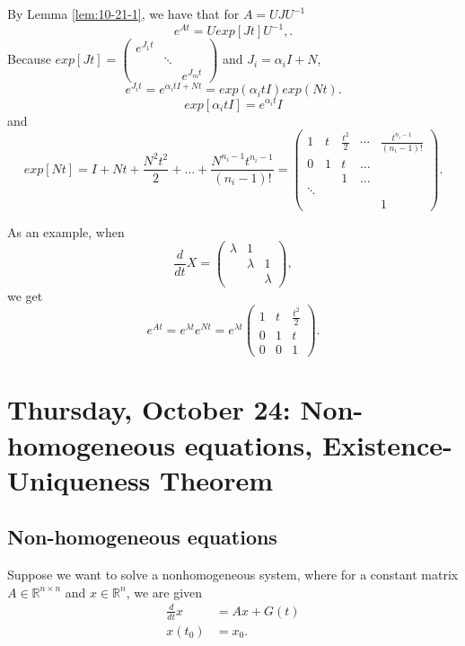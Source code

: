 \documentclass{tufte-handout}
\newcommand*\R{\mathbb{R}}
\theoremstyle{definition}
\begin{document}
By Lemma \ref{lem:10-21-1}, we have that for $A = U J U^{-1}$ \[
	e^{At} = U exp[Jt]U^{-1}
,.\] Because $exp[Jt] = \begin{pmatrix}
e^{J_1t} & & \\
		 & \ddots & \\
		 & & e^{J_m t}
\end{pmatrix}$ and $J_i = \alpha_i I + N$,
\[
	e^{J_i t} = e^{\alpha_i t I + N t} = exp(\alpha_i t I) exp(Nt)
.\] 
\[
	exp[\alpha_i tI] = e^{\alpha_i t}I
\] and \[
exp[Nt] = I + Nt + \frac{N^2 t^2}{2} + \ldots + \frac{N^{n_i - 1} t^{n_i - 1}}{\left( n_i - 1 \right)!}= \begin{pmatrix}
	1 & t & \frac{t^2}{2} & \cdots & \frac{t^{n_i - 1}}{(n_i -1)!} \\
	0 & 1 & t & \ldots & \\
	  & & 1 & \ldots & \\
	  \ddots \\
	  & & & & 1
\end{pmatrix} .\] 

As an example, when \[
	\frac{d}{dt}X = \begin{pmatrix}
		\lambda & 1 &  \\
				& \lambda & 1 \\
				 & & \lambda
		\end{pmatrix},\] we get \[ e^{At} = e^{\lambda t} e^{N t} = e^{\lambda t } \begin{pmatrix}
		1 & t & \frac{t^2}{2} \\
		0 & 1 & t \\
		0 & 0 & 1
	\end{pmatrix} 
.\] 

\section{Thursday, October 24: Non-homogeneous equations, Existence-Uniqueness Theorem}
\subsection{Non-homogeneous equations}
Suppose we want to solve a nonhomogeneous system, where for a constant matrix $A \in \R^{n\times n}$ and $x \in \R^{n}$, we are given
\begin{align}
	\frac{d}{dt}x &= Ax + G(t) \label{10-23-2} \\
	x(t_0) &= x_0
.\end{align}
\end{document}
